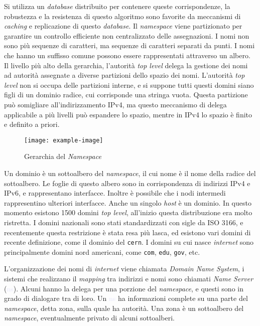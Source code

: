 \documentclass{article}
\numberwithin{equation}{subsection}
\begin{document}
Si utilizza un \textit{database} distribuito per contenere queste corrispondenze, la robustezza e la resistenza di questo algoritmo sono favorite da meccanismi di \textit{caching} e replicazione di questo \textit{database}. 
Il \textit{namespace} viene partizionato per garantire un controllo efficiente non centralizzato delle assegnazioni. I nomi non sono più sequenze di caratteri, ma sequenze di 
caratteri separati da punti. 
I nomi che hanno un suffisso comune possono essere rappresentati attraverso un albero. 
Il livello più alto della gerarchia, l'autorità \textit{top level} delega la gestione dei nomi ad autorità assegnate a diverse partizioni dello spazio dei nomi. 
L'autorità \textit{top level} non si occupa delle partizioni interne, e si suppone tutti questi domini siano figli di un dominio radice, cui corrisponde una stringa vuota. 
Questa partizione può somigliare all'indirizzamento \textcolor{BurntOrange}{IPv4}, ma questo meccanismo di delega applicabile a più livelli può espandere lo spazio, mentre in \textcolor{BurntOrange}{IPv4} lo 
spazio è finito e definito a priori. 

\begin{figure}[H]%
    \centering%
    \texttt{[image: example-image]}%
    \caption{Gerarchia del \textit{Namespace}}%
\end{figure}

Un dominio è un sottoalbero del \textit{namespace}, il cui nome è il nome della radice del sottoalbero. Le foglie di questo albero sono in corrispondenza di indirizzi \textcolor{BurntOrange}{IPv4} 
e \textcolor{OliveGreen}{IPv6}, e rappresentano interfacce. Inoltre è possibile che i nodi intermedi rappresentino ulteriori interfacce. Anche un singolo \textit{host} è un dominio. 
In questo momento esistono 1500 domini \textit{top level}, all'inizio questa distribuzione era molto ristretta. I domini nazionali sono stati standardizzati con sigle da ISO 3166, 
e recentemente questa restrizione è stata resa più lasca, ed esistono vari domini di recente definizione, come il dominio del \texttt{cern}. I domini su cui nasce \textit{internet} sono principalmente 
domini nord americani, come \texttt{com}, \texttt{edu}, \texttt{gov}, etc. 

L'organizzazione dei nomi di \textit{internet} viene chiamata \textit{Domain Name System}, i sistemi che realizzano il \textit{mapping} tra indirizzi e nomi sono chiamati 
\textit{Name Server} (\textcolor{Lavender}{ns}). Alcuni hanno la delega per una porzione del \textit{namespace}, e questi sono in grado di dialogare tra di loro. Un \textcolor{Lavender}{ns} ha informazioni complete su una parte 
del \textit{namespace}, detta zona, sulla quale ha autorità. Una zona è un sottoalbero del \textit{namespace}, eventualmente privato di alcuni sottoalberi. 
\end{document}
